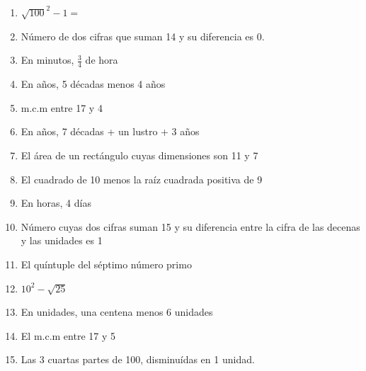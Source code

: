 \documentclass[letterpaper,11pt,twoside]{article}
\begin{document}
\begin{enumerate}
\item $\sqrt{100}^{2}-1=$
\item Número de dos cifras que suman 14 y su diferencia es 0.
\item En minutos, $\frac{3}{4}$ de hora
\item En años, 5 décadas menos 4 años
\item m.c.m entre 17 y 4
\item En años, 7 décadas + un lustro + 3 años
\item El área de un rectángulo cuyas dimensiones son 11 y 7
\item El cuadrado de 10 menos la raíz cuadrada positiva de 9
\item En horas, 4 días
\item Número cuyas dos cifras suman 15 y su diferencia entre la cifra de las decenas y las unidades es 1
\item El quíntuple del séptimo número primo
\item $10^{2}-\sqrt{25}$
\item En unidades, una centena menos 6 unidades
\item El m.c.m entre 17 y 5
\item Las 3 cuartas partes de 100, disminuídas en 1 unidad.
\end{enumerate}
\end{document}
